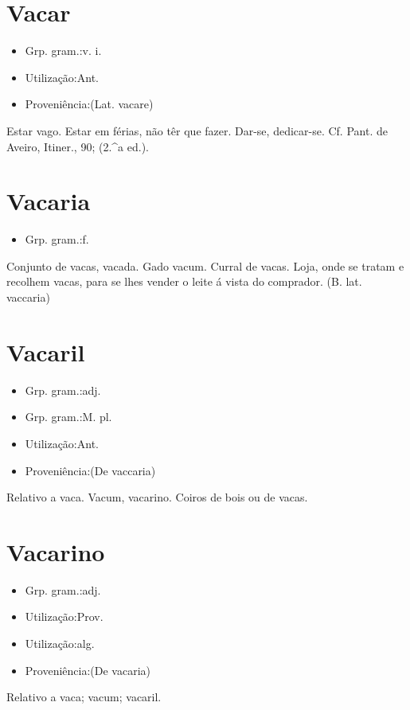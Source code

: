 \documentclass{article}
\begin{document}
\section{Vacar}
\begin{itemize}
\item {Grp. gram.:v. i.}
\end{itemize}
\begin{itemize}
\item {Utilização:Ant.}
\end{itemize}
\begin{itemize}
\item {Proveniência:(Lat. \textunderscore vacare\textunderscore )}
\end{itemize}
Estar vago.
Estar em férias, não têr que fazer.
Dar-se, dedicar-se. Cf. Pant. de Aveiro, \textunderscore Itiner.\textunderscore , 90; (2.^a ed.).
\section{Vacaria}
\begin{itemize}
\item {Grp. gram.:f.}
\end{itemize}
Conjunto de vacas, vacada.
Gado vacum.
Curral de vacas.
Loja, onde se tratam e recolhem vacas, para se lhes vender o leite á vista do comprador.
(B. lat. \textunderscore vaccaria\textunderscore )
\section{Vacaril}
\begin{itemize}
\item {Grp. gram.:adj.}
\end{itemize}
\begin{itemize}
\item {Grp. gram.:M. pl.}
\end{itemize}
\begin{itemize}
\item {Utilização:Ant.}
\end{itemize}
\begin{itemize}
\item {Proveniência:(De \textunderscore vaccaria\textunderscore )}
\end{itemize}
Relativo a vaca.
Vacum, vacarino.
Coiros de bois ou de vacas.
\section{Vacarino}
\begin{itemize}
\item {Grp. gram.:adj.}
\end{itemize}
\begin{itemize}
\item {Utilização:Prov.}
\end{itemize}
\begin{itemize}
\item {Utilização:alg.}
\end{itemize}
\begin{itemize}
\item {Proveniência:(De \textunderscore vacaria\textunderscore )}
\end{itemize}
Relativo a vaca; vacum; vacaril.
\end{document}
